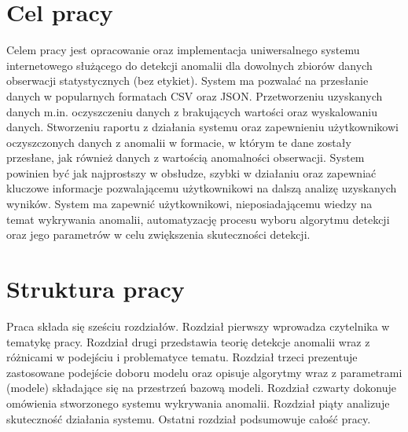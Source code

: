 \section{Cel pracy}
Celem pracy jest opracowanie oraz implementacja uniwersalnego systemu internetowego służącego do detekcji anomalii dla dowolnych zbiorów danych obserwacji statystycznych (bez etykiet). System ma pozwalać na przesłanie danych w popularnych formatach CSV oraz JSON. Przetworzeniu uzyskanych danych m.in. oczyszczeniu danych z brakujących wartości oraz wyskalowaniu danych. Stworzeniu raportu z działania systemu oraz zapewnieniu użytkownikowi oczyszczonych danych z anomalii w formacie, w którym te dane zostały przesłane, jak również danych z wartością anomalności obserwacji. System powinien być jak najprostszy w obsłudze, szybki w działaniu oraz zapewniać kluczowe informacje pozwalającemu użytkownikowi na dalszą analizę uzyskanych wyników. 
System ma zapewnić użytkownikowi, nieposiadającemu wiedzy na temat wykrywania anomalii, automatyzację procesu wyboru algorytmu detekcji oraz jego parametrów w celu zwiększenia skuteczności detekcji.

\section{Struktura pracy}

Praca składa się sześciu rozdziałów. Rozdział pierwszy wprowadza czytelnika w tematykę pracy. Rozdział drugi przedstawia teorię detekcje anomalii wraz z różnicami w podejściu i problematyce tematu. Rozdział trzeci prezentuje zastosowane podejście doboru modelu oraz opisuje algorytmy wraz z parametrami (modele) składające się na przestrzeń bazową modeli.  Rozdział czwarty dokonuje omówienia stworzonego systemu wykrywania anomalii. Rozdział piąty analizuje skuteczność działania systemu. Ostatni rozdział podsumowuje całość pracy. 